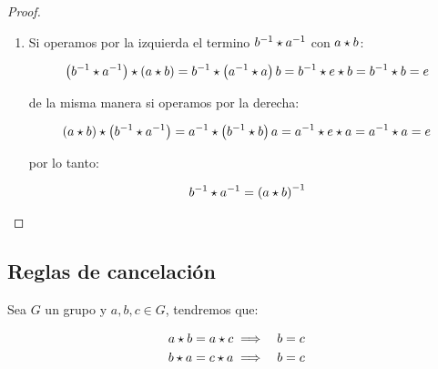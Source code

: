 \begin{proof}
\begin{enumerate}
                \item Si operamos por la izquierda el termino $b^{-1} \star a^{-1}$ con $a \star b$:

                \begin{equation*}
                    \left( b^{-1} \star a^{-1} \right) \star \left( a \star b \right) = b^{-1} \star \left( a^{-1} \star a \right) b = b^{-1} \star e \star b = b^{-1} \star b = e
                \end{equation*}

                de la misma manera si operamos por la derecha:

                \begin{equation*}
                    \left( a \star b \right) \star \left( b^{-1} \star a^{-1} \right) = a^{-1} \star \left( b^{-1} \star b \right) a = a^{-1} \star e \star a = a^{-1} \star a = e
                \end{equation*}

                por lo tanto:

                \begin{equation*}
                    b^{-1} \star a^{-1} = \left( a \star b \right)^{-1}
                \end{equation*}

            \end{enumerate}
        \end{proof}


    \subsection{Reglas de cancelación}

        \begin{proposicion}
            Sea $G$ un grupo y $a, b, c \in G$, tendremos que:

            \begin{eqnarray}
                a \star b = a \star c & \implies & b = c \nonumber \\
                b \star a = c \star a & \implies & b = c
            \end{eqnarray}
        \end{proposicion}

